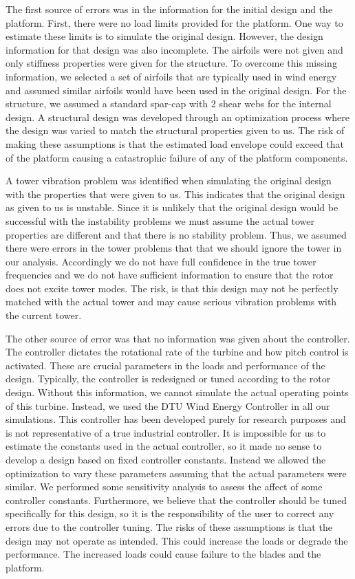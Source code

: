 The first source of errors was in the information for the initial design and the platform. First, there were no load limits provided for the platform. One way to estimate these limits is to simulate the original design. However, the design information for that design was also incomplete. The airfoils were not given and only stiffness properties were given for the structure. To overcome this missing information, we selected a set of airfoils that are typically used in wind energy and assumed similar airfoils would have been used in the original design. For the structure, we assumed a standard spar-cap with 2 shear webs for the internal design. A structural design was developed through an optimization process where the design was varied to match the structural properties given to us. The risk of making these assumptions is that the estimated load envelope could exceed that of the platform causing a catastrophic failure of any of the platform components. 

A tower vibration problem was identified when simulating the original design with the properties that were given to us. This indicates that the original design as given to us is unstable. Since it is unlikely that the original design would be successful with the instability problems we must assume the actual tower properties are different and that there is no stability problem. Thus, we assumed there were errors in the tower problems that that we should ignore the tower in our analysis. Accordingly we do not have full confidence in the true tower frequencies and we do not have sufficient information to ensure that the rotor does not excite tower modes. The risk, is that this design may not be perfectly matched with the actual tower and may cause serious vibration problems with the current tower.

The other source of error was that no information was given about the controller. The controller dictates the rotational rate of the turbine and how pitch control is activated. These are crucial parameters in the loads and performance of the design. Typically, the controller is redesigned or tuned according to the rotor design. Without this information, we cannot simulate the actual operating points of this turbine. Instead, we used the DTU Wind Energy Controller in all our simulations. This controller has been developed purely for research purposes and is not representative of a true industrial controller. It is impossible for us to estimate the constants used in the actual controller, so it made no sense to develop a design based on fixed controller constants. Instead we allowed the optimization to vary these parameters assuming that the actual parameters were similar. We performed some sensitivity analysis to assess the affect of some controller constants. Furthermore, we believe that the controller should be tuned specifically for this design, so it is the responsibility of the user to correct any errors due to the controller tuning. The risks of these assumptions is that the design may not operate as intended. This could increase the loads or degrade the performance. The increased loads could cause failure to the blades and the platform.

